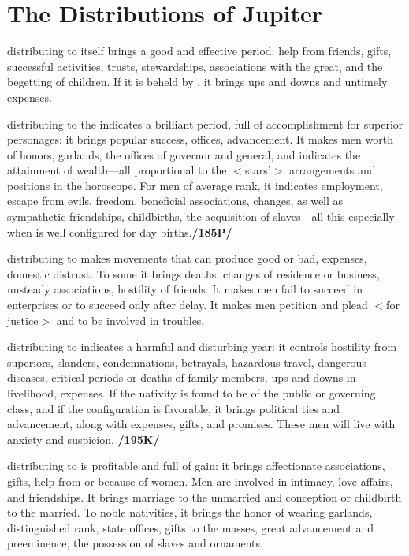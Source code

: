 \section{The Distributions of Jupiter}

\Jupiter\xspace distributing to itself brings a good and effective period: help from friends, gifts, successful activities, trusts, stewardships, associations with the great, and the begetting of children. If it is beheld by \Mars, it brings ups and downs and untimely expenses.

\Jupiter\xspace distributing to the \Sun\xspace indicates a brilliant period, full of accomplishment for superior
personages: it brings popular success, offices, advancement. It makes men worth of honors, garlands, the offices of governor and general, and indicates the attainment of wealth—all proportional to the $<$stars’$>$ arrangements and positions in the horoscope. For men of average rank, it indicates employment, escape from evils, freedom, beneficial associations, changes, as well as sympathetic friendships, childbirths, the acquisition of slaves—all this especially when \Jupiter\xspace is well configured for day births.\textbf{/185P/}

\Jupiter\xspace distributing to \Saturn\xspace makes movements that can produce good or bad, expenses, domestic distrust. To some it brings deaths, changes of residence or business, unsteady associations, hostility of friends. It makes men fail to succeed in enterprises or to succeed only after delay. It makes men petition and plead $<$for justice$>$ and to be involved in troubles.

\Jupiter\xspace distributing to \Mars\xspace indicates a harmful and disturbing year: it controls hostility from superiors, slanders, condemnations, betrayals, hazardous travel, dangerous diseases, critical periods or deaths of family members, ups and downs in livelihood, expenses. If the nativity is found to be of the public or governing class, and if the configuration is favorable, it brings political ties and advancement, along with expenses, gifts, and promises. These men will live with anxiety and suspicion. \textbf{/195K/}

\Jupiter\xspace distributing to \Venus\xspace is profitable and full of gain: it brings affectionate associations, gifts, help from or because of women. Men are involved in intimacy, love affairs, and friendships. It brings marriage to the unmarried and conception or childbirth to the married. To noble nativities, it brings the honor of wearing garlands, distinguished rank, state offices, gifts to the masses, great advancement and preeminence, the possession of slaves and ornaments.

